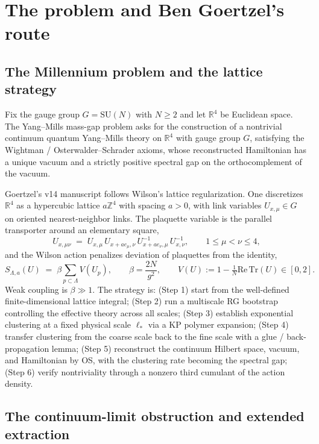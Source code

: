 \documentclass[11pt]{article}
\theoremstyle{definition}
\newcommand{\SUN}{\mathrm{SU}(N)}
\newcommand{\Tr}{\mathrm{Tr}}
\begin{document}
\section{The problem and Ben Goertzel's route}

\subsection{The Millennium problem and the lattice strategy}

Fix the gauge group $G = \SUN$ with $N \geq 2$ and let $\mathbb{R}^4$ be
Euclidean space. The Yang--Mills mass-gap problem asks for the construction of a
nontrivial continuum quantum Yang--Mills theory on $\mathbb{R}^4$ with gauge
group $G$, satisfying the Wightman / Osterwalder--Schrader axioms, whose
reconstructed Hamiltonian has a unique vacuum and a strictly positive spectral
gap on the orthocomplement of the vacuum.

Goertzel's v14 manuscript follows Wilson's lattice regularization. One
discretizes $\mathbb{R}^4$ as a hypercubic lattice $a\mathbb{Z}^4$ with spacing
$a>0$, with link variables $U_{x,\mu}\in G$ on oriented nearest-neighbor links.
The plaquette variable is the parallel transporter around an elementary square,
\[
  U_{x,\mu\nu} \;=\; U_{x,\mu}\,U_{x+a e_\mu,\nu}\,U_{x+a e_\nu,\mu}^{-1}\,U_{x,\nu}^{-1},
  \qquad 1 \leq \mu < \nu \leq 4,
\]
and the Wilson action penalizes deviation of plaquettes from the identity,
\[
  S_{\Lambda,a}(U) \;=\; \beta \sum_{p\subset\Lambda} V(U_p),
  \qquad \beta = \frac{2N}{g^2},
  \qquad V(U) := 1 - \tfrac{1}{N}\mathrm{Re}\,\Tr(U) \in [0,2].
\]
Weak coupling is $\beta \gg 1$. The strategy is: (Step 1) start from the
well-defined finite-dimensional lattice integral; (Step 2) run a multiscale RG
bootstrap controlling the effective theory across all scales; (Step 3)
establish exponential clustering at a fixed physical scale $\ell_*$ via a KP
polymer expansion; (Step 4) transfer clustering from the coarse scale back to
the fine scale with a glue / back-propagation lemma; (Step 5) reconstruct the
continuum Hilbert space, vacuum, and Hamiltonian by OS, with the clustering rate
becoming the spectral gap; (Step 6) verify nontriviality through a nonzero
third cumulant of the action density.

\subsection{The continuum-limit obstruction and extended extraction}
\end{document}
